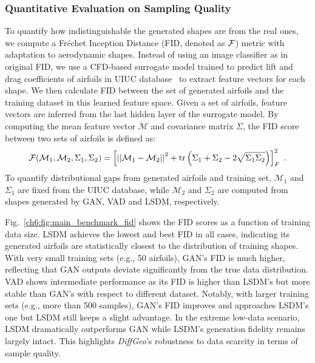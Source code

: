 \subsubsection{Quantitative Evaluation on Sampling Quality}

To quantify how indistinguishable the generated shapes are from the real ones, we compute a Fréchet Inception Distance (FID, denoted as $\mathcal{F}$) metric with adaptation to aerodynamic shapes. Instead of using an image classifier as in original FID, we use a CFD-based surrogate model trained to predict lift and drag coefficients of airfoils in UIUC database~\cite{aa.Baque2018} to extract feature vectors for each shape. We then calculate FID between the set of generated airfoils and the training dataset in this learned feature space. Given a set of airfoils, feature vectors are inferred from the last hidden layer of the surrogate model. By computing the mean feature vector $\mathcal{M}$ and covariance matrix $\Sigma$, the FID score between two sets of airfoils is defined as:
\begin{equation}
    \mathcal{F}(\mathcal{M}_1, \mathcal{M}_2, \Sigma_1, \Sigma_2) = \left[ \left|\left| \mathcal{M}_1 - \mathcal{M}_2 \right|\right|^2 + \text{tr}\left( \Sigma_1 + \Sigma_2 - 2\sqrt{\Sigma_1\Sigma_2} \right) \right]^2_F\;.
\end{equation}
To quantify distributional gaps from generated airfoils and training set, $\mathcal{M}_1$ and $\Sigma_1$ are fixed from the UIUC database, while $\mathcal{M}_2$ and $\Sigma_2$ are computed from shapes generated by GAN, VAD and LSDM, respectively.

Fig.~\ref{ch6:fig:main_benchmark_fid} shows the FID scores as a function of training data size. LSDM achieves the lowest and best FID in all cases, indicating its generated airfoils are statistically closest to the distribution of training shapes. With very small training sets (e.g., 50 airfoils), GAN’s FID is much higher, reflecting that GAN outputs deviate significantly from the true data distribution. VAD shows intermediate performance as its FID is higher than LSDM’s but more stable than GAN’s with respect to different dataset. Notably, with larger training sets (e.g., more than 500 samples), GAN’s FID improves and approaches LSDM’s one but LSDM still keeps a slight advantage. In the extreme low-data scenario, LSDM dramatically outperforms GAN while LSDM’s generation fidelity remains largely intact. This highlights \textit{DiffGeo}’s robustness to data scarcity in terms of sample quality.

